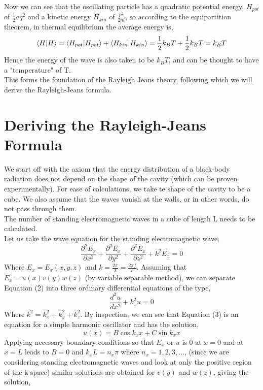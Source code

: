 \noindent Now we can see that the oscillating particle has a quadratic potential energy, $H_{pot}$  of $\frac{1}{2}aq^2$ and a kinetic energy $H_{kin}$ of $\frac{p^2}{2m}$, so according to the equipartition theorem, in thermal equilibrium the average energy is,
\begin{equation}
	\braket{H}=\braket{H_{pot}}+\braket{H_{kin}}=\frac{1}{2}k_BT+\frac{1}{2}k_BT=k_BT
\end{equation}	
Hence the energy of the wave is also taken to be $k_BT$, and can be thought to have a "temperature" of T. \\

\noindent This forms the foundation of the Rayleigh Jeans theory, following which we will derive the Rayleigh-Jeans formula.

\section{Deriving the Rayleigh-Jeans Formula}
We start off with the axiom that the energy distribution of a black-body radiation does not depend on the shape of the cavity (which can be proven experimentally). For ease of calculations, we take te shape of the cavity to be a cube. We also assume that the waves vanish at the walls, or in other words, do not pass through them.\\
\noindent The number of standing electromagnetic waves in a cube of length L needs to be calculated. \\
Let us take the wave equation for the standing electromagnetic wave,
\begin{equation}
	\frac{\partial^2E_x}{\partial x^2}+\frac{\partial^2E_x}{\partial y^2}+\frac{\partial^2E_x}{\partial z^2}+k^2E_x=0
\end{equation}
Where $E_x=E_x(x,y,z)$ and $k=\frac{2\pi}{\lambda}=\frac{2\pi f}{c}$.
Assuming that $E_x=u(x)v(y)w(z)$ (by variable separable method), we can separate Equation (2) into three ordinary differential equations of the type,
\begin{equation}
	\frac{d^2u}{dx^2}+k^2_xu=0
\end{equation}
Where $k^2=k^2_x+k^2_y+k^2_z$. By inspection, we can see that Equation (3) is an equation for a simple harmonic oscillator and has the solution,
\begin{equation}
	u(x)=B\cos k_xx+C\sin k_xx
\end{equation}
Applying necessary boundary conditions so that $E_x$ or $u$ is 0 at $x=0$ and at $x=L$ leads to $B=0$ and $k_xL=n_x\pi$ where $n_x=1,2,3,...$, (since we are considering standing electromagnetic waves and look at only the positive region of the k-space) similar solutions are obtained for $v(y)$ and $w(z)$, giving the solution,
